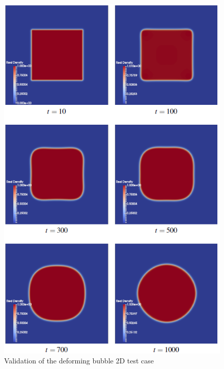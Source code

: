 \documentclass[12pt, openany]{book}
\begin{document}
    \begin{figure}[H]
    	\centering
    	\includegraphics[width=\linewidth]{Resources/Images/AntonioValid/DeformingBubble.PNG}
    	\caption{Validation of the deforming bubble 2D test case}
    	\label{fig:deform}
    \end{figure}
    
\end{document}
